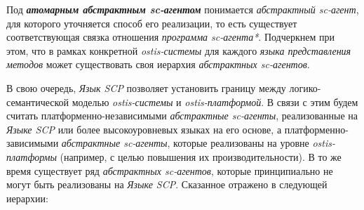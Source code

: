 Под \textbf{\textit{атомарным абстрактным sc-агентом}} понимается \textit{абстрактный sc-агент}, для которого уточняется способ его реализации, то есть существует соответствующая связка отношения \textit{программа sc-агента*}. Подчеркнем при этом, что в рамках конкретной \textit{ostis-системы} для каждого \textit{языка представления методов} может существовать своя иерархия \textit{абстрактных sc-агентов}.

В свою очередь, \textit{Язык SCP} позволяет установить границу между логико-семантической моделью \textit{ostis-системы} и \textit{ostis-платформой}. В связи с этим будем считать платформенно-независимыми \textit{абстрактные sc-агенты}, реализованные на \textit{Языке SCP} или более высокоуровневых языках на его основе, а платформенно-зависимыми \textit{абстрактные sc-агенты}, которые реализованы на уровне \textit{ostis-платформы} (например, с целью повышения их производительности). В то же время существует ряд \textit{абстрактных sc-агентов}, которые принципиально не могут быть реализованы на \textit{Языке SCP}. Сказанное отражено в следующей иерархии:

